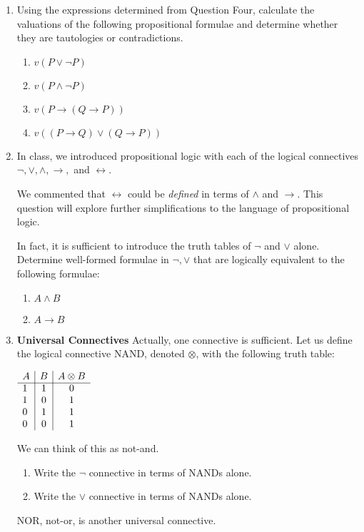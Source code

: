\documentclass[11pt]{report}
\begin{document}
\begin{enumerate}
	\item Using the expressions determined from Question Four, calculate the valuations of the following propositional formulae and determine whether they are tautologies or contradictions. 

		\begin{enumerate}
			\item $v(P \lor \lnot P)$
			\item $v(P \land \lnot P)$
			\item $v(P \to (Q \to P))$
			\item $v((P \to Q) \lor (Q \to P))$
		\end{enumerate}
	
	\item In class, we introduced propositional logic with each of the logical connectives $\lnot, \lor, \land, \rightarrow,$ and $\leftrightarrow$. 
	
	\vspace{0.2cm}
	
	We commented that $\leftrightarrow$ could be \emph{defined} in terms of $\land$ and $\rightarrow$. This question will explore further simplifications to the language of propositional logic.

	\vspace{0.2cm}
	
	In fact, it is sufficient to introduce the truth tables of $\lnot$ and $\lor$ alone. Determine well-formed formulae in $\lnot, \lor$ that are logically equivalent to the following formulae: 
		
		\begin{enumerate}
			\item $A \land B$
			\item $A \to B$
		\end{enumerate} 

	\item {\bf Universal Connectives} Actually, one connective is sufficient. Let us define the logical connective NAND, denoted $\otimes$, with the following truth table:
	
	\begin{center}
		$\begin{array}{ l | c | c }			
		A & B & A \otimes B\\
		\cline{1 - 3}
		1 & 1 & 0 \\ 
		1 & 0 & 1 \\
		0 & 1 & 1 \\
		0 & 0 & 1 	
		\end{array}$
	\end{center}
	
	We can think of this as not-and.
	
	\begin{enumerate}
		\item Write the $\lnot$ connective in terms of NANDs alone. 
		\item Write the $\lor$ connective in terms of NANDs alone. 		
	\end{enumerate}

	NOR, not-or, is another universal connective. 
\end{enumerate}
	
\end{document}
